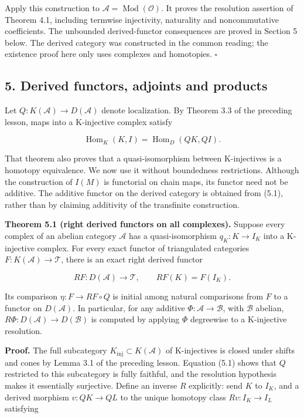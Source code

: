 \documentclass[
  english,
  11pt,
  a4paper,
]{article}
\begin{document}
Apply this construction to
\(\mathcal A=\operatorname{Mod}(\mathcal O)\). It proves the resolution
assertion of Theorem 4.1, including termwise injectivity, naturality and
noncommutative coefficients. The unbounded derived-functor consequences
are proved in Section 5 below. The derived category was constructed in
the common reading; the existence proof here only uses complexes and
homotopies. \(\square\)

\subsection{5. Derived functors, adjoints and
products}\label{k-injective-resolutions-in-grothendieck-categories--5-derived-functors-adjoints-and-products}

Let \(Q:K(\mathcal A)\to D(\mathcal A)\) denote localization. By Theorem
3.3 of the preceding lesson, maps into a K-injective complex satisfy

\[\operatorname{Hom}_{K}(K,I)=\operatorname{Hom}_{D}(QK,QI).
\tag{5.1}\]

That theorem also proves that a quasi-isomorphism between K-injectives
is a homotopy equivalence. We now use it without boundedness
restrictions. Although the construction of \(I(M)\) is functorial on
chain maps, its functor need not be additive. The additive functor on
the derived category is obtained from (5.1), rather than by claiming
additivity of the transfinite construction.

\textbf{Theorem 5.1 (right derived functors on all complexes).} Suppose
every complex of an abelian category \(\mathcal A\) has a
quasi-isomorphism \(q_K:K\to I_K\) into a K-injective complex. For every
exact functor of triangulated categories
\(F:K(\mathcal A)\to\mathcal T\), there is an exact right derived
functor

\[RF:D(\mathcal A)\longrightarrow\mathcal T,
\qquad RF(K)=F(I_K).\]

Its comparison \(\eta:F\to RF\circ Q\) is initial among natural
comparisons from \(F\) to a functor on \(D(\mathcal A)\). In particular,
for any additive \(\Phi:\mathcal A\to\mathcal B\), with \(\mathcal B\)
abelian, \(R\Phi:D(\mathcal A)\to D(\mathcal B)\) is computed by
applying \(\Phi\) degreewise to a K-injective resolution.

\textbf{Proof.} The full subcategory
\(K_{\mathrm{inj}}\subset K(\mathcal A)\) of K-injectives is closed
under shifts and cones by Lemma 3.1 of the preceding lesson. Equation
(5.1) shows that \(Q\) restricted to this subcategory is fully faithful,
and the resolution hypothesis makes it essentially surjective. Define an
inverse \(R\) explicitly: send \(K\) to \(I_K\), and a derived morphism
\(v:QK\to QL\) to the unique homotopy class \(Rv:I_K\to I_L\) satisfying
\end{document}
